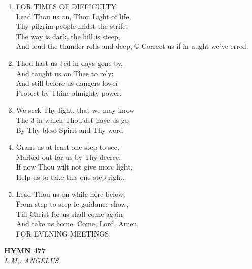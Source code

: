 \documentclass[11pt,a4paper]{article}
\begin{document}
\begin{enumerate}
    \item FOR TIMES OF DIFFICULTY \\
        Lead Thou us on, Thou Light of life, \\
        Thy pilgrim people midst the strife; \\
        The way is dark, the hill is steep, \\
        And loud the thunder rolls and deep, © Correct us if in aught we've erred.

    \item Thou hast us Jed in days gone by, \\
        And taught us on Thee to rely; \\
        And still before us dangers lower \\
        Protect by Thine almighty power.

    \item We seck Thy light, that we may know \\
        The 3 in which Thou'dst have us go \\
        By Thy blest Spirit and Thy word

    \item Grant us at least one step to see, \\
        Marked out for us by Thy decree; \\
        If now Thou wilt not give morc light, \\
        Help us to take this one step right.

    \item Lead Thou us on while here below; \\
        From step to step fe guidance show, \\
        Till Christ for us shall come again \\
        And take us home. Come, Lord, Amen, \\
        FOR EVENING MEETINGS

\end{enumerate}

\newpage
\begin{center}
    {\Large \textbf{HYMN 477}}
    \\
    \textit{L.M,. ANGELUS}
\end{center}
\vspace{1em}
\end{document}
